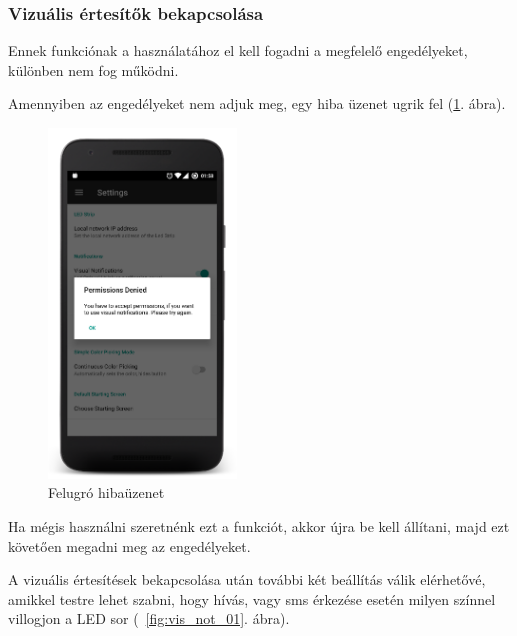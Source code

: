 \documentclass[../main.tex]{subfiles}
\begin{document}
            \subsubsection{Vizuális értesítők bekapcsolása}
                Ennek funkciónak a használatához el kell fogadni a megfelelő engedélyeket, különben nem fog működni.
                
                Amennyiben az engedélyeket nem adjuk meg, egy hiba üzenet ugrik fel (\ref{fig:permission_denied}. ábra).
                \begin{figure}[h!]
                    \centering
                    \includegraphics[width=5cm]{android_res/screen_pictures/visual_notification_02.png}
                    \caption{Felugró hibaüzenet}
                    \label{fig:permission_denied}
                \end{figure}
                Ha mégis használni szeretnénk ezt a funkciót, akkor újra be kell állítani, majd ezt követően megadni meg az engedélyeket.
                
                A vizuális értesítések bekapcsolása után további két beállítás válik elérhetővé, amikkel testre lehet szabni, hogy hívás, vagy sms érkezése esetén milyen színnel villogjon a LED sor (~\ref{fig:vis_not_01}. ábra).
                
\end{document}
